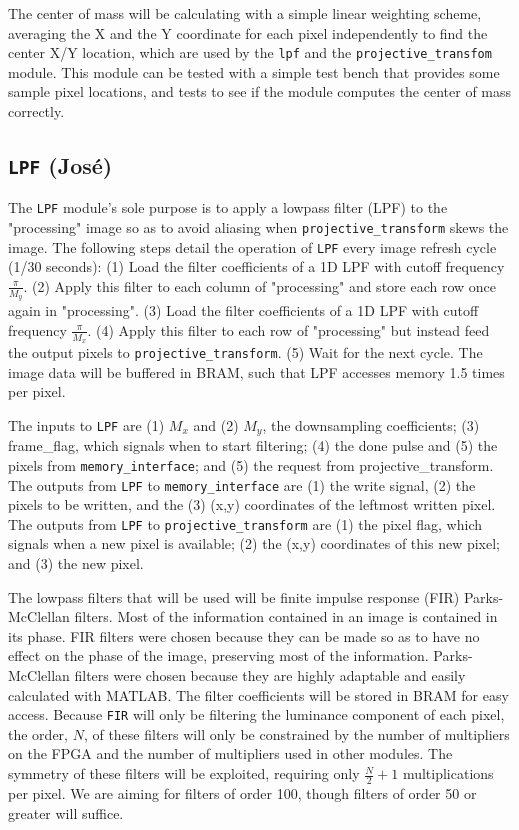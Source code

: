 \documentclass[10pt]{article}
\begin{document}
The center of mass will be calculating with a simple linear weighting scheme, averaging the X and the Y coordinate for each pixel independently to find the center X/Y location, which are used by the {\tt lpf} and the {\tt projective\_transfom} module. This module can be tested with a simple test bench that provides some sample pixel locations, and tests to see if the module computes the center of mass correctly.

\subsection{{\tt LPF} (Jos\'{e})}
The {\tt LPF} module's sole purpose is to apply a lowpass filter (LPF) to the "processing" image so as to avoid aliasing when {\tt projective\_transform} skews the image. The following steps detail the operation of {\tt LPF} every image refresh cycle (1/30 seconds): (1) Load the filter coefficients of a 1D LPF with cutoff frequency \( \frac{\pi}{M_y} \). (2) Apply this filter to each column of "processing" and store each row once again in "processing". (3) Load the filter coefficients of a 1D LPF with cutoff frequency \( \frac{\pi}{M_x} \). (4) Apply this filter to each row of "processing"  but instead feed the output pixels to {\tt projective\_transform}. (5) Wait for the next cycle. The image data will be buffered in BRAM, such that LPF accesses memory 1.5 times per pixel.

The inputs to {\tt LPF} are (1) \( M_x \) and (2) \( M_y \), the downsampling coefficients; (3) frame\_flag, which signals when to start filtering; (4) the done pulse and (5) the pixels from {\tt memory\_interface}; and (5) the request from {projective\_transform}. The outputs from {\tt LPF} to {\tt memory\_interface} are (1) the write signal, (2) the pixels to be written, and the (3) (x,y) coordinates of the leftmost written pixel. The outputs from {\tt LPF} to {\tt projective\_transform} are (1) the pixel flag, which signals when a new pixel is available; (2) the (x,y) coordinates of this new pixel; and (3) the new pixel.

The lowpass filters that will be used will be finite impulse response (FIR) Parks-McClellan filters. Most of the information contained in an image is contained in its phase. FIR filters were chosen because they can be made so as to have no effect on the phase of the image, preserving most of the information. Parks-McClellan filters were chosen because they are highly adaptable and easily calculated with MATLAB. The filter coefficients will be stored in BRAM for easy access. Because {\tt FIR} will only be filtering the luminance component of each pixel, the order, \( N \), of these filters will only be constrained by the number of multipliers on the FPGA and the number of multipliers used in other modules. The symmetry of these filters will be exploited, requiring only \( \frac{N}{2}+1 \) multiplications per pixel. We are aiming for filters of order 100, though filters of order 50 or greater will suffice.
\end{document}
